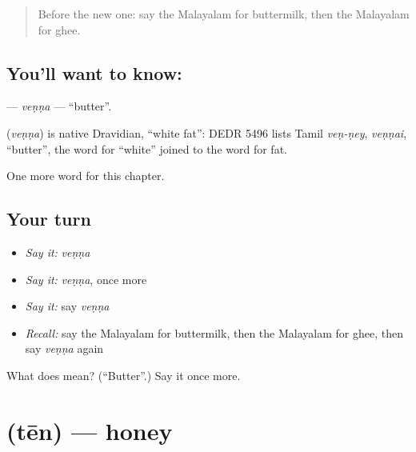 \label{lesson:ML-C208-venna}



\begin{quote}
Before the new one: say the Malayalam for buttermilk, then the Malayalam for ghee.
\end{quote}

\subsection*{You'll want to know: }
\textbf{} — \emph{veṇṇa} — \textquotedblleft{}butter\textquotedblright{}.

\begin{cousinweb}
\textbf{} (\emph{veṇṇa}) is native Dravidian, \textquotedblleft{}white fat\textquotedblright{}: DEDR 5496 lists Tamil \emph{veṇ-ṇey}, \emph{veṇṇai}, \textquotedblleft{}butter\textquotedblright{}, the word for \textquotedblleft{}white\textquotedblright{} joined to the word for fat.
\end{cousinweb}

\begin{grammarlens}[title={What you've built}]
One more word for this chapter.
\end{grammarlens}

\subsection*{Your turn}
\begin{itemize}
\raggedright
  \item \emph{Say it:} \emph{veṇṇa}
  \item \emph{Say it:} \emph{veṇṇa}, once more
  \item \emph{Say it:} say \emph{veṇṇa}
  \item \emph{Recall:} say the Malayalam for buttermilk, then the Malayalam for ghee, then say \emph{veṇṇa} again
\end{itemize}

\begin{tcolorbox}[breakable,colback=teal!4,colframe=teal!35!black,title={Before you move on}]
What does  mean? (\textquotedblleft{}Butter\textquotedblright{}.) Say it once more.
\end{tcolorbox}
\section[\texorpdfstring{\ml{തേൻ} (tēn)}{തേൻ (tēn)}]{ (tēn) — honey}

